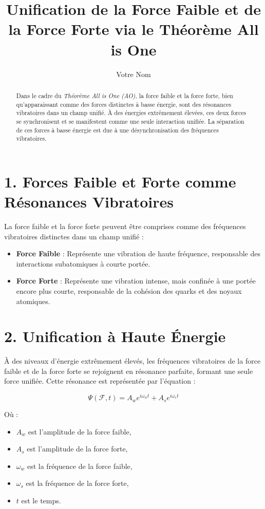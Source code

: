 \documentclass{article}
\title{Unification de la Force Faible et de la Force Forte via le Théorème All is One}
\author{Votre Nom}
\date{}
\begin{document}
\maketitle

\begin{abstract}
Dans le cadre du \textit{Théorème All is One (AO)}, la force faible et la force forte, bien qu'apparaissant comme des forces distinctes à basse énergie, sont des résonances vibratoires dans un champ unifié. À des énergies extrêmement élevées, ces deux forces se synchronisent et se manifestent comme une seule interaction unifiée. La séparation de ces forces à basse énergie est due à une désynchronisation des fréquences vibratoires.
\end{abstract}

\section{1. Forces Faible et Forte comme Résonances Vibratoires}

La force faible et la force forte peuvent être comprises comme des fréquences vibratoires distinctes dans un champ unifié :
\begin{itemize}
    \item \textbf{Force Faible} : Représente une vibration de haute fréquence, responsable des interactions subatomiques à courte portée.
    \item \textbf{Force Forte} : Représente une vibration intense, mais confinée à une portée encore plus courte, responsable de la cohésion des quarks et des noyaux atomiques.
\end{itemize}

\section{2. Unification à Haute Énergie}

À des niveaux d'énergie extrêmement élevés, les fréquences vibratoires de la force faible et de la force forte se rejoignent en résonance parfaite, formant une seule force unifiée. Cette résonance est représentée par l'équation :

\[
\Psi(\mathcal{F}, t) = A_w e^{i\omega_w t} + A_s e^{i\omega_s t}
\]

Où :
\begin{itemize}
    \item \( A_w \) est l'amplitude de la force faible,
    \item \( A_s \) est l'amplitude de la force forte,
    \item \( \omega_w \) est la fréquence de la force faible,
    \item \( \omega_s \) est la fréquence de la force forte,
    \item \( t \) est le temps.
\end{itemize}
\end{document}
